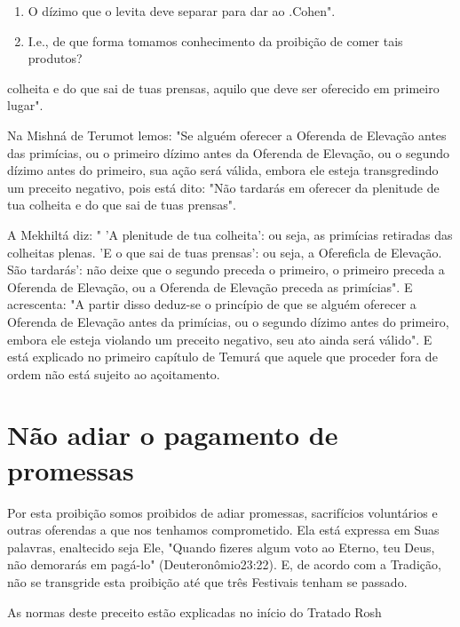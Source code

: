 \begin{itemize}
\begin{enumrate}
\begin{itemize}
\begin{itemize}
\begin{itemize}
\begin{enumerate}
\def\labelenumi{\arabic{enumi}.}
\setcounter{enumi}{317}
\item
 
 O dízimo que o levita deve separar para dar ao
 .Cohen".
 
\item
 
 I.e., de que forma tomamos conhecimento da proibição de comer tais
 produtos?
 
\end{enumerate}

colheita e do que sai de tuas prensas, aquilo que deve ser oferecido em
primei­ro lugar".

Na Mishná de Terumot lemos: "Se alguém oferecer a Oferenda de Elevação
antes das primícias, ou o primeiro dízimo antes da Oferenda de
Eleva­ção, ou o segundo dízimo antes do primeiro, sua ação será válida,
embora ele esteja transgredindo um preceito negativo, pois está dito:
"Não tardarás em ofe­recer da plenitude de tua colheita e do que sai de
tuas prensas".

A Mekhiltá diz: " 'A plenitude de tua colheita': ou seja, as primícias
retiradas das colheitas plenas. 'E o que sai de tuas prensas': ou seja,
a Ofereficla de Elevação. São tardarás': não deixe que o segundo preceda
o primeiro, o primeiro preceda a Oferenda de Elevação, ou a Oferenda de
Elevação preceda as primícias". E acrescenta: "A partir disso deduz-se o
princípio de que se al­guém oferecer a Oferenda de Elevação antes da
primícias, ou o segundo dízi­mo antes do primeiro, embora ele esteja
violando um preceito negativo, seu ato ainda será válido". E está
explicado no primeiro capítulo de Temurá que aquele que proceder fora de
ordem não está sujeito ao açoitamento.

\section{Não adiar o pagamento de promessas}

Por esta proibição somos proibidos de adiar promessas, sacrifícios
voluntários e outras oferendas a que nos tenhamos comprometido. Ela está
ex­pressa em Suas palavras, enaltecido seja Ele, "Quando fizeres algum
voto ao Eterno, teu Deus, não demorarás em pagá-lo" (Deuteronômio23:22).
E, de acor­do com a Tradição, não se transgride esta proibição até que
três Festivais te­nham se passado.


As normas deste preceito estão explicadas no início do Tratado Rosh



\end{itemize}
\end{itemize}
\end{itemize}
\end{enumrate}
\end{itemize}
